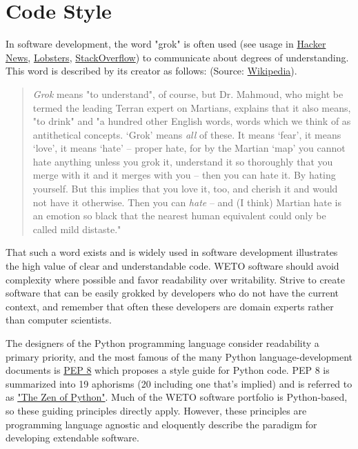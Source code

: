\documentclass[]{nrel}
\begin{document}
\section{Code Style}
In software development, the word "grok" is often used (see usage in
\href{https://hn.algolia.com/?q=grok}{Hacker News},
\href{https://lobste.rs/search?q=grok\&what=stories\&order=newest}{Lobsters},
\href{https://stackoverflow.com/search?tab=newest\&q=grok\&searchOn=3}{StackOverflow})
to communicate about degrees of understanding. This word is described by its creator as follows:
(Source: \href{https://en.wikipedia.org/wiki/Grok}{Wikipedia}).
\begin{quote}

\textit{Grok} means "to understand", of course, but Dr. Mahmoud, who might be termed the leading
Terran expert on Martians, explains that it also means, "to drink" and "a hundred other
English words, words which we think of as antithetical concepts. ‘Grok’ means \textit{all} of
these. It means ‘fear’, it means ‘love’, it means ‘hate’ – proper hate, for by the Martian
‘map’ you cannot hate anything unless you grok it, understand it so thoroughly that you
merge with it and it merges with you – then you can hate it. By hating yourself. But this
implies that you love it, too, and cherish it and would not have it otherwise. Then you
can \textit{hate} – and (I think) Martian hate is an emotion so black that the nearest human
equivalent could only be called mild distaste."
\end{quote}

That such a word exists and is widely used in software development illustrates the high value
of clear and understandable code.
WETO software should avoid complexity where possible and favor readability over writability.
Strive to create software that can be easily grokked by developers who do not have the current
context, and remember that often these developers are domain experts rather than
computer scientists.

The designers of the Python programming language consider readability a primary priority, and
the most famous of the many Python language-development documents is
\href{https://peps.python.org/pep-0008/}{PEP 8} which proposes a style guide for Python code.
PEP 8 is summarized into 19 aphorisms (20 including one that’s implied) and is referred to as
\href{https://peps.python.org/pep-0020/}{"The Zen of Python"}. Much of the WETO software portfolio is
Python-based, so these guiding principles directly apply. However, these principles are
programming language agnostic and eloquently describe the paradigm for developing
extendable software.
\end{document}
